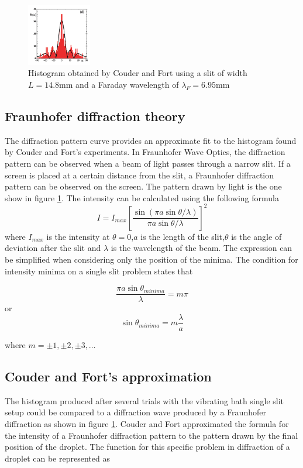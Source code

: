 \documentclass[
 reprint,
 amsmath,amssymb,
pra,
]{revtex4-1}
\begin{document}
	\begin{figure}[h]
		\includegraphics[width=0.25\textwidth]{img2.png}
		\caption{Histogram obtained by Couder and Fort using a slit of width $L=14.8$mm and a Faraday wavelength of $\lambda_F = 6.95$mm \cite{couder_single-particle_2006}}
		\label{fig:diffraction}
	\end{figure}

	\subsection{Fraunhofer diffraction theory}
    
    The diffraction pattern curve provides an approximate fit to the histogram found by Couder and Fort's experiments. In Fraunhofer Wave Optics, the diffraction pattern can be observed when a beam of light passes through a narrow slit. If a screen is placed at a certain distance from the slit, a Fraunhofer diffraction pattern can be observed on the screen.\cite{serway_physics_2014} The pattern drawn by light is the one show in figure \ref{fig:diffraction}. The intensity can be calculated using the following formula
    $$ I=I_{max} \left[ \frac{\sin (\pi a \sin \theta / \lambda)}{\pi a \sin \theta / \lambda} \right]^2$$
    where $I_{max}$ is the intensity at $\theta=0$,$a$ is the length of the slit,$\theta$ is the angle of deviation after the slit and $\lambda$ is the wavelength of the beam. The expression can be simplified when considering only the position of the minima. The condition for intensity minima on a single slit problem states that

    $$ \frac{\pi a \sin \theta_{minima}}{\lambda}=m\pi$$
    or
    $$ \sin \theta_{minima}=m \frac{\lambda}{a} $$

    where $ m=\pm 1, \pm 2, \pm 3, \dots$

    \subsection{Couder and Fort's approximation}

    The histogram produced after several trials with the vibrating bath single slit setup could be compared to a diffraction wave produced by a Fraunhofer diffraction as shown in figure \ref{fig:diffraction}. Couder and Fort approximated the formula for the intensity of a Fraunhofer diffraction pattern to the pattern drawn by the final position of the droplet. The function for this specific problem in diffraction of a droplet can be represented as
\end{document}

